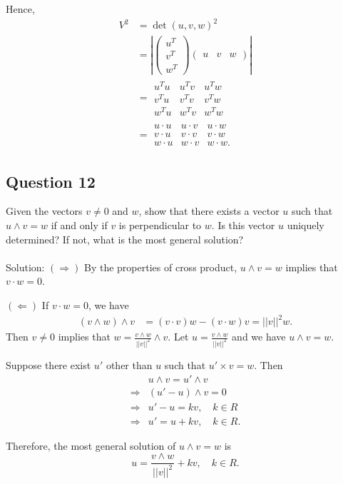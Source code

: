 \documentclass[12pt]{article}
\begin{document}
Hence, \begin{align*}
     V^2 &= \det (u,v,w)^2\\
     &=|\begin{pmatrix}
     u^T\\
     v^T\\
     w^T
     \end{pmatrix}
     \begin{pmatrix}
      u&v&w
     \end{pmatrix}|\\
     &=\begin{array}{|ccc|}
     u^T u & u^T v & u^T w\\
     v^T u & v^T v & v^T w\\
     w^T u & w^T v & w^T w
     \end{array}\\
     &=\begin{array}{|ccc|}
     u \cdot u & u \cdot v & u \cdot w\\
     v \cdot u & v \cdot v & v \cdot w\\
     w \cdot u & w \cdot v & w \cdot w.
     \end{array}
 \end{align*}
\subsection*{Question 12}
Given the vectors $v \neq 0$ and $w$, show that there exists a vector $u$ such that $u \wedge v = w$ if and only if $v$ is perpendicular to $w$. Is this vector $u$ uniquely determined? If not, what is the most general solution?\\\\
Solution: $(\Rightarrow)$ By the properties of cross product, $u \wedge v = w$ implies that $v \cdot w = 0$.

$(\Leftarrow)$ If $v\cdot w=0$, we have \begin{align*}
     (v\wedge w)\wedge v &= (v\cdot v)w - (v\cdot w)v=||v||^2w.
\end{align*}
Then $v\neq 0$ implies that $w = \frac{v\wedge w}{||v||^2}\wedge v$. Let $u=\frac{v\wedge w}{||v||^2}$ and we have $u\wedge v = w$.

Suppose there exist $u'$ other than $u$ such that $u'\times v = w$. Then \begin{align*}
     &u \wedge v = u' \wedge v \\
     \Rightarrow &(u'-u)\wedge v = 0\\
     \Rightarrow &u'-u = kv, \quad k\in R\\
     \Rightarrow &u' = u + kv, \quad k\in R.
\end{align*}

Therefore, the most general solution of $u\wedge v=w$ is 
\begin{equation*}
     u = \frac{v\wedge w}{||v||^2} + kv,\quad k\in R.
\end{equation*}
\end{document}
